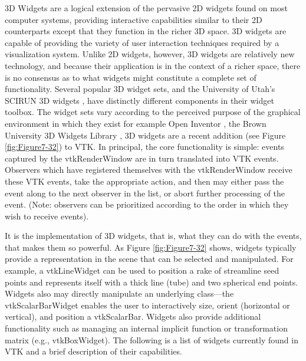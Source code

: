 3D Widgets are a logical extension of the pervasive 2D widgets found on most computer systems, providing interactive capabilities similar to their 2D counterparts except that they function in the richer 3D space. 3D widgets are capable of providing the variety of user interaction techniques required by a visualization system. Unlike 2D widgets, however, 3D widgets are relatively new technology, and because their application is in the context of a richer space, there is no consensus as to what widgets might constitute a complete set of functionality. Several popular 3D widget sets, and the University of Utah's SCIRUN 3D widgets \cite{Purciful95}, have distinctly different components in their widget toolbox. The widget sets vary according to the perceived purpose of the graphical environment in which they exist for example Open Inventor \cite{Wernecke94}, the Brown University 3D Widgets Library \cite{Zeleznik93},  3D widgets are a recent addition (see Figure \ref{fig:Figure7-32}) to VTK. In principal, the core functionality is simple: events captured by the vtkRenderWindow are in turn translated into VTK events. Observers which have registered themselves with the vtkRenderWindow receive these VTK events, take the appropriate action, and then may either pass the event along to the next observer in the list, or abort further processing of the event. (Note: observers can be prioritized according to the order in which they wish to receive events).

It is the implementation of 3D widgets, that is, what they can do with the events, that makes them so powerful. As Figure \ref{fig:Figure7-32} shows, widgets typically provide a representation in the scene that can be selected and manipulated. For example, a vtkLineWidget can be used to position a rake of streamline seed points and represents itself with a thick line (tube) and two spherical end points. Widgets also may directly manipulate an underlying class---the vtkScalarBarWidget enables the user to interactively size, orient (horizontal or vertical), and position a vtkScalarBar. Widgets also provide additional functionality such as managing an internal implicit function or transformation matrix (e.g., vtkBoxWidget). The following is a list of widgets currently found in VTK and a brief description of their capabilities.

